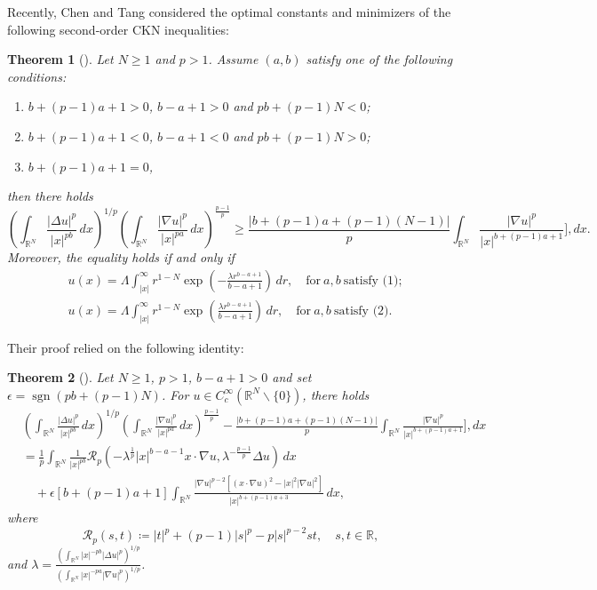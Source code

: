 \documentclass[11pt]{article}
\newtheorem{theorem}{Theorem}[section]
\newcommand{\R}{\mathbb{R}}
\DeclareMathOperator{\sgn}{sgn}
\numberwithin{equation}{section}
\begin{document}
Recently, Chen and Tang \cite{chen2024} considered the optimal constants and minimizers of the following second-order CKN inequalities:
\begin{theorem}[{\cite[Theorem 2.5]{chen2024}}]
    Let $N\ge 1$ and $p>1$. Assume $(a,b)$ satisfy one of the following conditions:
    \begin{enumerate}
        \item [(1)] $b+(p-1)a+1>0$, $b-a+1>0$ and $pb+(p-1)N<0$;
        \item [(2)] $b+(p-1)a+1<0$, $b-a+1<0$ and $pb+(p-1)N>0$;
        \item [(3)] $b+(p-1)a+1=0$,
    \end{enumerate}
    then there holds
    \begin{equation}
        \left(\int_{\R^N} \frac{|\Delta u|^p}{|x|^{pb}}\,dx\right)^{1/p}\left(\int_{\R^N} \frac{|\nabla u|^p}{|x|^{pa}}\,dx\right)^{\frac{p-1}{p}} \ge \frac{|b+(p-1)a+(p-1)(N-1)|}{p}\int_{\R^N} \frac{|\nabla u|^p}{|x|^{b+(p-1)a+1}}],dx.
    \end{equation}
    Moreover, the equality holds if and only if
    \begin{align*}
        & u(x) = \Lambda \int_{|x|}^\infty r^{1-N}\exp\left(-\frac{\lambda r^{b-a+1}}{b-a+1}\right)\,dr,\quad \text{for}\ a,b \ \text{satisfy (1)}; \\
        & u(x) = \Lambda \int_{|x|}^\infty r^{1-N}\exp\left(\frac{\lambda r^{b-a+1}}{b-a+1}\right)\,dr,\quad \text{for} \ a,b \ \text{satisfy (2)}.
    \end{align*}
\end{theorem}
Their proof relied on the following identity:
\begin{theorem}[{\cite[Theorem 2.3 and 2.4]{chen2024}}]
    Let $N\ge 1$, $p>1$, $b-a+1>0$ and set $\epsilon = \sgn(pb+(p-1)N)$. For $u\in C_c^\infty(\R^N\backslash\{0\})$, there holds
    \begin{equation}\label{identity-I of 2nd order}
        \begin{aligned}
            &  \left(\int_{\R^N} \frac{|\Delta u|^p}{|x|^{pb}}\,dx\right)^{1/p}\left(\int_{\R^N} \frac{|\nabla u|^p}{|x|^{pa}}\,dx\right)^{\frac{p-1}{p}} - \frac{|b+(p-1)a+(p-1)(N-1)|}{p}\int_{\R^N} \frac{|\nabla u|^p}{|x|^{b+(p-1)a+1}}],dx\\
             & = \frac 1p \int_{\R^N} \frac{1}{|x|^{pb}}\mathcal{R}_p\left(-\lambda^{\frac 1p}|x|^{b-a-1}x\cdot \nabla u, \lambda^{-\frac{p-1}{p}}\Delta u \right)\,dx \\
            & \quad +\epsilon [b+(p-1)a+1]\int_{\R^N} \frac{|\nabla u|^{p-2}[(x\cdot \nabla u)^2-|x|^2|\nabla u|^2]}{|x|^{b+(p-1)a+3}}\,dx,
        \end{aligned}
    \end{equation}
    where
    \[ \mathcal{R}_p(s,t) \coloneqq |t|^p + (p-1)|s|^p - p|s|^{p-2}st,\quad s,t \in \R,\]
    and $\lambda = \frac{\left(\int_{\R^N} |x|^{-pb}|\Delta u|^p\right)^{1/p}}{\left(\int_{\R^N}|x|^{-pa}|\nabla u|^p\right)^{1/p}}$.
\end{theorem}
\end{document}
